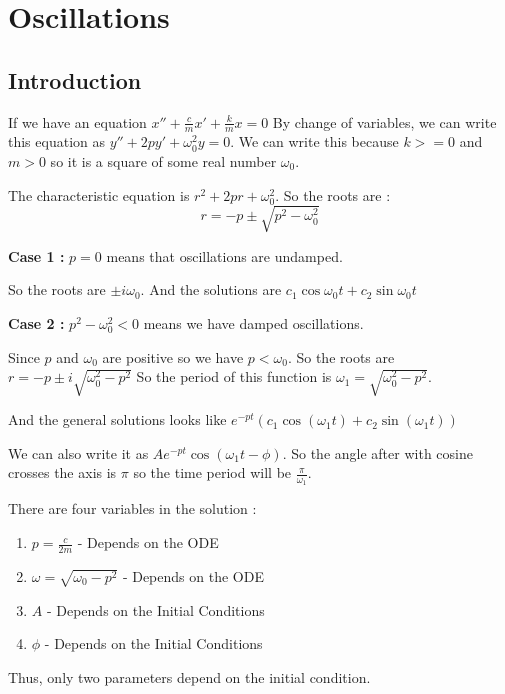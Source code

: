 

\chapter{Oscillations}

\bigbreak

\section{Introduction}

If we have an equation $x'' + \frac{c}{m} x' + \frac{k}{m} x = 0$
By change of variables, we can write this equation as $ y'' + 2p y' + \omega_0^2 y = 0 $.
We can write this because $k >= 0$ and $m > 0$ so it is a square of some real number $\omega_0$.

The characteristic equation is $r^2 + 2p r + \omega_0^2$.
So the roots are :
$$ r = -p \pm \sqrt{p^2 - \omega_0^2} $$

{\bf Case 1 : } $p = 0$ means that oscillations are undamped.

So the roots are $\pm i \omega_0$.
And the solutions are $c_1\cos \omega_0 t + c_2 \sin \omega_0 t$

{\bf Case 2 : } $p^2 - \omega_0^2 < 0$ means we have damped oscillations.

Since $p$ and $\omega_0$ are positive so we have $p < \omega_0$.
So the roots are $r = -p \pm i \sqrt{\omega_0^2 - p^2}$
So the period of this function is $\omega_1 = \sqrt{\omega_0^2 - p^2}$.

And the general solutions looks like $e^{-pt}(c_1 \cos (\omega_1 t) + c_2 \sin (\omega_1 t))$

We can also write it as $Ae^{-pt}\cos(\omega_1 t - \phi)$.
So the angle after with cosine crosses the axis is $\pi$ so the time period will be $\frac{\pi}{\omega_1}$.

There are four variables in the solution :
\begin{enumerate}
	\item $p = \frac{c}{2m}$ - Depends on the ODE
	\item $\omega = \sqrt{\omega_0 - p^2}$ - Depends on the ODE
	\item $A$ - Depends on the Initial Conditions
	\item $\phi$ - Depends on the Initial Conditions
\end{enumerate}

Thus, only two parameters depend on the initial condition.

